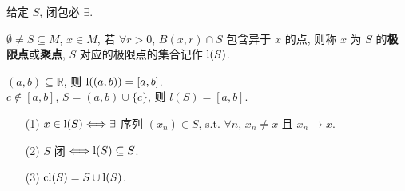 \documentclass{note}
\begin{document}
给定 $S$, 闭包必 $\exists$.

\begin{df}[极限点(/聚点)]
    $\emptyset\neq S\subseteq M$, $x\in M$, 若 $\forall r>0$, $B(x,r)\cap S$ 包含异于 $x$ 的点, 则称 $x$ 为 $S$ 的\textbf{极限点}或\textbf{聚点}, $S$ 对应的极限点的集合记作 $\operatorname{l}(S)$.
\end{df}

\begin{eg}
    $(a,b)\subseteq\mathbb{R}$, 则 $\operatorname{l}((a,b))=[a,b]$.\\
    $c\notin[a,b]$, $S=(a,b)\cup\{c\}$, 则 $l(S)=[a,b]$.
\end{eg}

\begin{thm}[(课本定理 12.3)]
    \begin{itemize}
        \item[(1)] $x\in\operatorname{l}(S)\Longleftrightarrow\exists$ 序列 $(x_n)\in S$, s.t. $\forall n$, $x_n\neq x$ 且 $x_n\rightarrow x$.
        \item[(2)] $S$ 闭 $\Longleftrightarrow\operatorname{l}(S)\subseteq S$.
        \item[(3)] $\operatorname{cl}(S)=S\cup\operatorname{l}(S)$.
    \end{itemize}
\end{thm}
\end{document}
